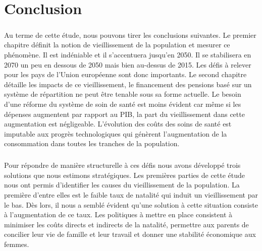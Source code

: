 \chapter*{Conclusion}
\paragraph{}Au terme de cette étude, nous pouvons tirer les conclusions suivantes. Le premier chapitre définit la notion de vieillissement de la population et mesurer ce phénomène. Il est indéniable et il s'accentuera jusqu'en 2050. Il se stabilisera en 2070 un peu en dessous de 2050 mais bien au-dessus de 2015. Les défis à relever pour les pays de l'Union européenne sont donc importants. Le second chapitre détaille les impacts de ce vieillissement,  le financement des pensions basé sur un système de répartition ne peut être tenable sous sa forme actuelle. Le besoin d’une réforme du système de soin de santé est moins évident car même si les dépenses augmentent par rapport au PIB, la part du vieillissement dans cette augmentation est négligeable. L'évolution des coûts des soins de santé est imputable aux progrès technologiques qui génèrent l’augmentation de la consommation dans toutes les tranches de la population.
 
\paragraph{}Pour répondre de manière structurelle à ces défis nous avons développé trois solutions que nous estimons stratégiques. Les premières parties de cette étude nous ont permis d’identifier les causes du vieillissement de la population. La première d’entre elles est le faible taux de natalité qui induit un vieillissement par le bas. Dès lors, il nous a semblé évident qu’une solution à cette situation consiste à l’augmentation de ce taux. Les politiques à mettre en place consistent à minimiser les coûts directs et indirects de la natalité, permettre aux parents de concilier leur vie de famille et leur travail et donner une stabilité économique aux femmes.
 
